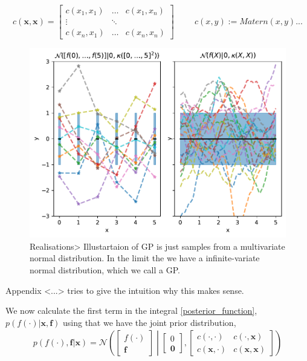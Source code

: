   $$c(\textbf{x}, \textbf{x}) = \begin{bmatrix}
    c(x_1,x_1) & \dots & c(x_1,x_n)\\
    \vdots& \ddots\\
    c(x_n,x_1) & \dots & c(x_n,x_n)
\end{bmatrix}\hspace{1cm} c(x, y) := Matern(x,y)...$$ 

\begin{figure}[h]
    \centering
    \includegraphics[width = \textwidth]{Pictures/GP_samples_mattern.pdf}
    \caption{Realisations> Illustartaion of GP is just samples from a multivariate normal distribution. In the
    limit the we have a infinite-variate normal distribution, which we call a GP.}
\end{figure}

Appendix <...> tries to give the intuition why this makes sense. 

We now calculate the first term in the integral \eqref{posterior_function}, 
$p(f(\cdot)|\textbf{x}, \textbf{f})$ using that we have the joint prior 
distribution, 
\begin{align}
    p(f(\cdot),\textbf{f}|\textbf{x}) = \mathcal{N}\left(\begin{bmatrix}
        f(\cdot)\\ \textbf{f}
    \end{bmatrix} \middle| \begin{bmatrix}
        0\\ \textbf{0}
    \end{bmatrix}, \begin{bmatrix}
        c(\cdot, \cdot) & c(\cdot,\textbf{x})\\
        c(\textbf{x}, \cdot) & c(\textbf{x}, \textbf{x})
    \end{bmatrix} \right)
\end{align}

